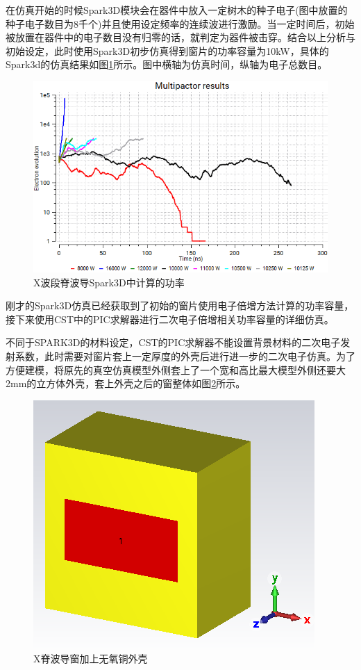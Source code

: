 \documentclass[master]{thesis-uestc}
\begin{document}
在仿真开始的时候Spark3D模块会在器件中放入一定树木的种子电子(图中放置的种子电子数目为8千个)并且使用设定频率的连续波进行激励。当一定时间后，初始被放置在器件中的电子数目没有归零的话，就判定为器件被击穿。结合以上分析与初始设定，此时使用Spark3D初步仿真得到窗片的功率容量为10kW，具体的Spark3d的仿真结果如图\ref{fig:X波段Spark3D中的功率}所示。图中横轴为仿真时间，纵轴为电子总数目。
\begin{figure}[!htb]
    \centering
    \includegraphics[width=0.5\linewidth]{pic/chapter3/X波段Spark3D中的功率.png}
    \caption{X波段脊波导Spark3D中计算的功率}
    \label{fig:X波段Spark3D中的功率}
\end{figure}

刚才的Spark3D仿真已经获取到了初始的窗片使用电子倍增方法计算的功率容量，接下来使用CST中的PIC求解器进行二次电子倍增相关功率容量的详细仿真。

不同于SPARK3D的材料设定，CST的PIC求解器不能设置背景材料的二次电子发射系数，此时需要对窗片套上一定厚度的外壳后进行进一步的二次电子仿真。为了方便建模，将原先的真空仿真模型外侧套上了一个宽和高比最大模型外侧还要大2mm的立方体外壳，套上外壳之后的窗整体如图\ref{fig:X无氧铜外壳}所示。
\begin{figure}[!htb]
    \centering
    \includegraphics[width=0.4\linewidth]{pic/chapter3/X脊波导窗无氧铜外壳.png}
    \caption{X脊波导窗加上无氧铜外壳}
    \label{fig:X无氧铜外壳}
\end{figure}
\end{document}
